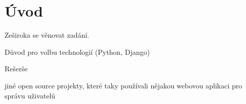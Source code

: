 \chapter{Úvod}
\label{1-uvod}

Zeširoka se věnovat zadání.

Důvod pro volbu technologií (Python, Django) 

Rešerše

jiné open source projekty, které taky používali nějakou webovou aplikaci pro správu uživatelů